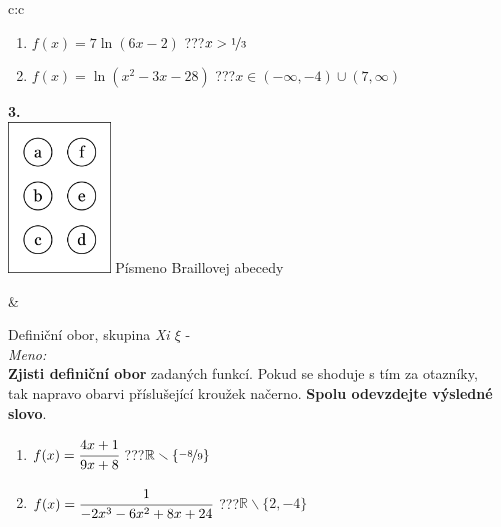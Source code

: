 \documentclass[10pt]{report}
\begin{document}
\begin{tabular}{c:c}
\begin{minipage}[c][99mm][t]{0.49\linewidth}
\begin{center}
\begin{minipage}{0.77\linewidth}
\begin{center}
\begin{varwidth}{\textwidth}
\begin{enumerate}
\item $f(x)=7\ln{(6x-2)}$\quad \dotfill\; ???\;\dotfill \quad $x>\nicefrac{1}{3}$
\item $f(x)=\ln{(x^2-3x-28)}$\quad \dotfill\; ???\;\dotfill \quad $x\in(-\infty , -4)\cup(7 , \infty)$
\end{enumerate}
\end{varwidth}
\end{center}
\end{minipage}
\begin{minipage}{0.20\linewidth}
\begin{center}
{\Huge\bfseries 3.} \\[2mm]
\includegraphics[height=40mm]{../images/braille.png}
{\small Písmeno Braillovej abecedy}
\end{center}
\end{minipage}
\end{center}
\end{minipage}
&
\begin{minipage}[c][99mm][t]{0.49\linewidth}
\begin{center}
\vspace{7mm}
{\huge Definiční obor, skupina \textit{Xi $\xi$} -}\\[4.5mm]
\textit{Meno:}\phantom{xxxxxxxxxxxxxxxxxxxxxxxxxxxxxxxxxxxxxxxxxxxxxxxxxxxxxxxxxxxxxxxxx}\\[3.5mm]
\textbf{Zjisti definiční obor} zadaných funkcí. Pokud se shoduje s tím za otazníky,\\tak napravo obarvi příslušející kroužek načerno. \textbf{Spolu odevzdejte výsledné slovo}.\\[3mm]
\begin{minipage}{0.77\linewidth}
\begin{center}
\begin{varwidth}{\textwidth}
\begin{enumerate}
\normalsize
\item $f(x)=\cfrac{4x+1}{9x+8}$\quad \dotfill\; ???\;\dotfill \quad $\mathbb{R}\smallsetminus\{\nicefrac{-8}{9}\}$
\item $f(x)=\cfrac{1}{-2x^3-6x^2+8x+24}$\quad \dotfill\; ???\;\dotfill \quad $\mathbb{R}\smallsetminus\{2,-4\}$

\end{enumerate}
\end{varwidth}
\end{center}
\end{minipage}
\end{center}
\end{minipage}
\end{tabular}
\end{document}
